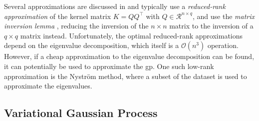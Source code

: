 Several approximations are discussed in \cite{rasmussen} and typically use a \textit{reduced-rank approximation} of the kernel matrix $K=Q Q^\intercal$ with $Q \in \mathcal{R}^{n \times q}$, and use the \textit{matrix inversion lemma} \cite[p.~201]{rasmussen}, reducing the inversion of the $n \times n$ matrix to the inversion of a $q \times q$ matrix instead. Unfortunately, the optimal reduced-rank approximations depend on the eigenvalue decomposition, which itself is a $\mathcal{O}(n^3)$ operation. However, if a cheap approximation to the eigenvalue decomposition can be found, it can potentially be used to approximate the \acrshort{gp}. One such low-rank approximation is the Nyström method, where a subset of the dataset is used to approximate the eigenvalues.    

\subsection{Variational Gaussian Process}





